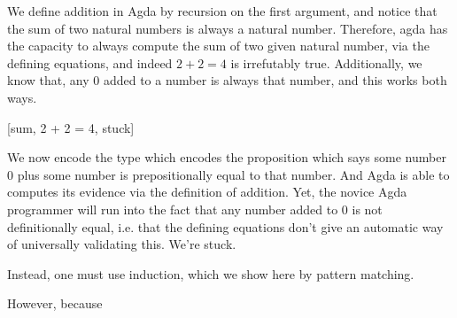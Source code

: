 We define addition in Agda by recursion on the first argument, and notice that
the sum of two natural numbers is always a natural number. Therefore, agda has
the capacity to always compute the sum of two given natural number, via the defining
equations, and indeed $2+2=4$ is irrefutably true. Additionally, we know that,
any $0$ added to a number is always that number, and this works both ways.



[sum, 2 + 2 = 4, stuck]

We now encode the type which encodes the proposition which says some number $0$
plus some number is prepositionally equal to that number. And Agda is able to
computes its evidence via the definition of addition. Yet, the novice Agda
programmer will run into the fact that any number added to $0$ is not
definitionally equal, i.e. that the defining equations don't give an automatic
way of universally validating this. We're stuck. 

Instead, one must use induction, which we show here by pattern matching.



However, because 





